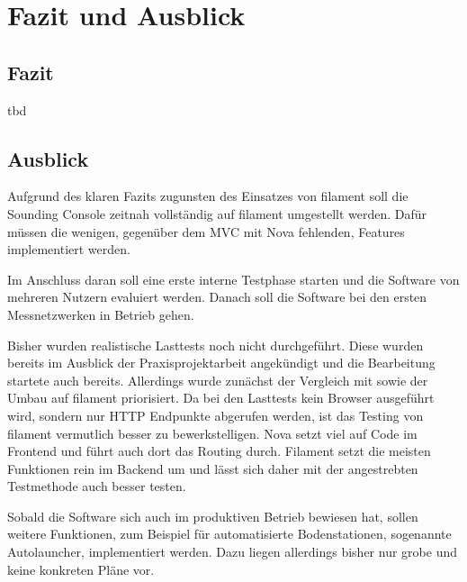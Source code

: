 \section{Fazit und Ausblick}

\subsection{Fazit}
\color{red}
tbd
\color{black}

\subsection{Ausblick}
Aufgrund des klaren Fazits zugunsten des Einsatzes von filament soll die Sounding Console zeitnah vollständig auf filament umgestellt werden.
Dafür müssen die wenigen, gegenüber dem MVC mit Nova fehlenden, Features implementiert werden.

Im Anschluss daran soll eine erste interne Testphase starten und die Software von mehreren Nutzern evaluiert werden.
Danach soll die Software bei den ersten Messnetzwerken in Betrieb gehen.

Bisher wurden realistische Lasttests noch nicht durchgeführt.
Diese wurden bereits im Ausblick der Praxisprojektarbeit angekündigt und die Bearbeitung startete auch bereits.
Allerdings wurde zunächst der Vergleich mit sowie der Umbau auf filament priorisiert.
Da bei den Lasttests kein Browser ausgeführt wird, sondern nur HTTP Endpunkte abgerufen werden, ist das Testing von filament vermutlich besser zu bewerkstelligen.
Nova setzt viel auf Code im Frontend und führt auch dort das Routing durch.
Filament setzt die meisten Funktionen rein im Backend um und lässt sich daher mit der angestrebten Testmethode auch besser testen.

Sobald die Software sich auch im produktiven Betrieb bewiesen hat, sollen weitere Funktionen, zum Beispiel für automatisierte Bodenstationen, sogenannte Autolauncher, implementiert werden.
Dazu liegen allerdings bisher nur grobe und keine konkreten Pläne vor.
